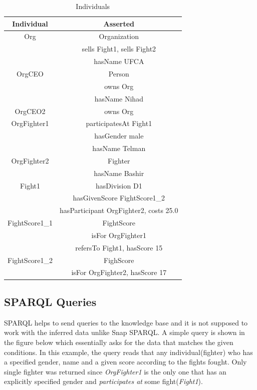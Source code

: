 \documentclass[a4paper]{article}
\begin{document}
\begin{table}[H]
	\centering
	\begin{tabular}{|c|c|}
		\hline
		\textbf{Individual} & \textbf{Asserted} \\
		\hline
		Org & Organization \\
			& sells Fight1, sells Fight2 \\
			& hasName UFCA \\
		\hline
		OrgCEO & Person \\
			& owns Org \\
			& hasName Nihad \\
		\hline
		OrgCEO2 & owns Org \\
		\hline
		OrgFighter1 & participatesAt Fight1 \\
			& hasGender male \\
			& hasName Telman \\
		\hline
		OrgFighter2 & Fighter \\
			& hasName Bashir \\
		\hline
		Fight1 & hasDivision D1 \\
			& hasGivenScore FightScore1\_2 \\
			& hasParticipant OrgFighter2, costs 25.0 \\
		\hline
		FightScore1\_1 & FightScore \\
			& isFor OrgFighter1 \\
			& refersTo Fight1, hasScore 15 \\
		\hline
		FightScore1\_2 & FighScore \\
			& isFor OrgFighter2, hasScore 17 \\
		\hline
	\end{tabular}
	\caption{Individuals}
	\label{tab:asserted}
\end{table}

\subsection{SPARQL Queries}
SPARQL helps to send queries to the knowledge base and it is not supposed to work with the inferred data unlike Snap SPARQL. A simple query is shown in the figure below which essentially asks for the 
data that matches the given conditions. In this example, the query reads that any individual(fighter) who has a specified gender, name and a given score according to the fights fought. Only single 
fighter was returned since \textit{OrgFighter1} is the only one that has an explicitly specified gender and \textit{participates at} some fight(\textit{Fight1}).
\end{document}
